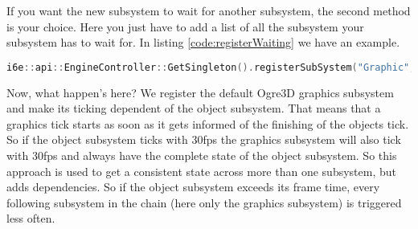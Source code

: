 \documentclass{article}
\begin{document}
If you want the new subsystem to wait for another subsystem, the second method is your choice. Here you just have to add a list of all the subsystem your subsystem has to wait for. In listing \ref{code:registerWaiting} we have an example.

\begin{lstlisting}[language=C++, style=basic, caption={registering graphics subsystem waiting for object subsystem}, label=code:registerWaiting]
i6e::api::EngineController::GetSingleton().registerSubSystem("Graphic", new i6e::modules::GraphicsController(), { i6e::core::Subsystem::Object });
\end{lstlisting}

Now, what happen's here? We register the default Ogre3D graphics subsystem and make its ticking dependent of the object subsystem. That means that a graphics tick starts as soon as it gets informed of the finishing of the objects tick. So if the object subsystem ticks with 30fps the graphics subsystem will also tick with 30fps and always have the complete state of the object subsystem. So this approach is used to get a consistent state across more than one subsystem, but adds dependencies. So if the object subsystem exceeds its frame time, every following subsystem in the chain (here only the graphics subsystem) is triggered less often.
\end{document}
